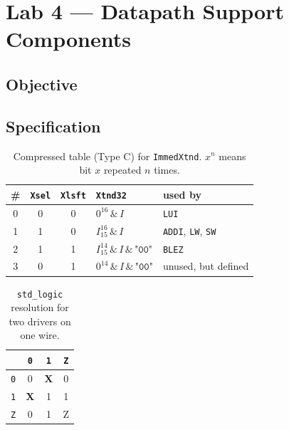 
\chapter{Lab 4 --- Datapath Support Components}

\section{Objective}

\section{Specification}

\begin{table}[htbp]
\centering
\caption{Compressed table (Type C) for \texttt{ImmedXtnd}.
$x^{n}$ means bit $x$ repeated $n$ times.}
\label{tab:lab04-truth}
\begin{tabular}{ccc||ll}
\toprule
\# & \texttt{Xsel} & \texttt{Xlsft} & \texttt{Xtnd32} & used by \\
\midrule
0 & 0 & 0 & $0^{16}\,\&\,I$ & \texttt{LUI} \\
1 & 1 & 0 & $I_{15}^{16}\,\&\,I$ & \texttt{ADDI}, \texttt{LW}, \texttt{SW} \\
2 & 1 & 1 & $I_{15}^{14}\,\&\,I\,\&\,\texttt{"00"}$ & \texttt{BLEZ} \\
3 & 0 & 1 & $0^{14}\,\&\,I\,\&\,\texttt{"00"}$ & unused, but defined \\
\bottomrule
\end{tabular}
\end{table}

\begin{table}[htbp]
\centering
\caption{\texttt{std\_logic} resolution for two drivers on one wire.}
\label{tab:lab04-resolution}
\begin{tabular}{c||ccc}
\toprule
 & \texttt{0} & \texttt{1} & \texttt{Z} \\
\midrule
\texttt{0} & 0 & \textbf{X} & 0 \\
\texttt{1} & \textbf{X} & 1 & 1 \\
\texttt{Z} & 0 & 1 & Z \\
\bottomrule
\end{tabular}
\end{table}

